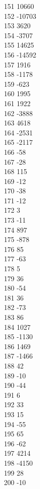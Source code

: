 { 151	10660 \\
 152	-10703 \\
 153	3620 \\
 154	-3707 \\
 155	14625 \\
 156	-14592 \\
 157	1916 \\
 158	-1178 \\
 159	-623 \\
 160	1995 \\
 161	1922 \\
 162	-3888 \\
 163	4618 \\
 164	-2531 \\
 165	-2117 \\
 166	-58 \\
 167	-28 \\
 168	115 \\
 169	-12 \\
 170	-38 \\
 171	-12 \\
 172	3 \\
 173	-11 \\
 174	897 \\
 175	-878 \\
 176	85 \\
 177	-63 \\
 178	5 \\
 179	36 \\
 180	-54 \\
 181	36 \\
 182	-73 \\
 183	86 \\
 184	1027 \\
 185	-1130 \\
 186	1469 \\
 187	-1466 \\
 188	42 \\
 189	-10 \\
 190	-44 \\
 191	6 \\
 192	33 \\
 193	15 \\
 194	-55 \\
 195	65 \\
 196	-62 \\
 197	4214 \\
 198	-4150 \\
 199	28 \\
 200	-10 \\
}
